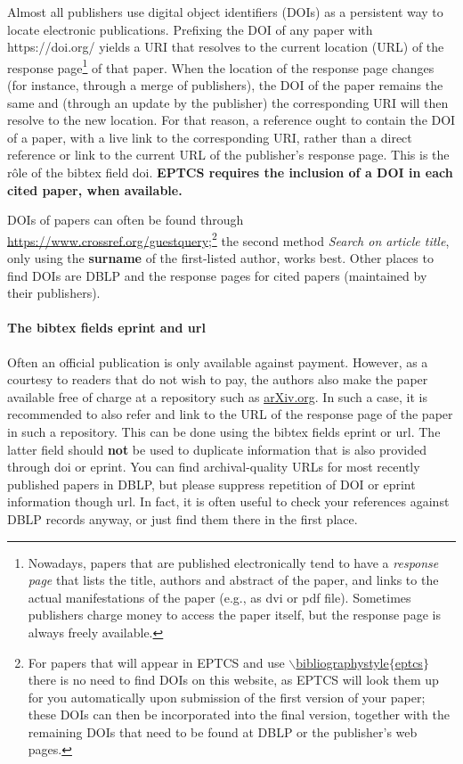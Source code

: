 \documentclass[submission,copyright,creativecommons]{eptcs}
\begin{document}
Almost all publishers use digital object identifiers (DOIs) as a
persistent way to locate electronic publications. Prefixing the DOI of
any paper with {\ttfamily https://doi.org/} yields a URI that resolves to the
current location (URL) of the response page\footnote{Nowadays, papers
  that are published electronically tend
  to have a \emph{response page} that lists the title, authors and
  abstract of the paper, and links to the actual manifestations of
  the paper (e.g., as {\ttfamily dvi} or {\ttfamily pdf} file). Sometimes
  publishers charge money to access the paper itself, but the response
  page is always freely available.}
of that paper. When the location of the response page changes (for
instance, through a merge of publishers), the DOI of the paper remains
the same and (through an update by the publisher) the corresponding
URI will then resolve to the new location. For that reason, a reference
ought to contain the DOI of a paper, with a live link to the corresponding
URI, rather than a direct reference or link to the current URL of the
publisher's response page. This is the r\^ole of the bibtex field {\ttfamily doi}.
{\bfseries EPTCS requires the inclusion of a DOI in each cited paper, when available.}

DOIs of papers can often be found through
\url{https://www.crossref.org/guestquery};\footnote{For papers that will appear
  in EPTCS and use \href{https://eptcs.web.cse.unsw.edu.au/eptcs.bst}
  {\ttfamily $\backslash$bibliographystyle$\{$eptcs$\}$} there is no need to
  find DOIs on this website, as EPTCS will look them up for you
  automatically upon submission of the first version of your paper;
  these DOIs can then be incorporated into the final version, together
  with the remaining DOIs that need to be found at DBLP or the publisher's web pages.}
the second method {\itshape Search on article title}, only using the {\bfseries
surname} of the first-listed author, works best.
Other places to find DOIs are DBLP and the response pages for cited
papers (maintained by their publishers).

\paragraph{The bibtex fields {\ttfamily eprint} and {\ttfamily url}}

Often an official publication is only available against payment. However,
as a courtesy to readers that do not wish to pay, the authors also
make the paper available free of charge at a repository such as
\url{arXiv.org}. In such a case, it is recommended to also refer and
link to the URL of the response page of the paper in such a
repository.  This can be done using the bibtex fields {\ttfamily eprint}
or {\ttfamily url}.  The latter field should \textbf{not} be used
to duplicate information that is also provided through {\ttfamily doi} or {\ttfamily eprint}.
You can find archival-quality URLs for most recently published papers
in DBLP, but please suppress repetition of DOI or {\ttfamily eprint} information though {\ttfamily url}.
In fact, it is often useful to check your references against DBLP records anyway,
or just find them there in the first place.
\end{document}
